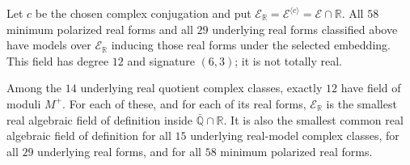 \begin{theorem}
\label{pp:thm:realdefinitionfield}
Let $c$ be the chosen complex conjugation and put
$\mathcal E_{\mathbb R}=\mathcal E^{\langle c\rangle}
=\mathcal E\cap\mathbb R$. All $58$ minimum polarized real forms
and all $29$ underlying real forms classified above have models over
$\mathcal E_{\mathbb R}$ inducing those real forms under the selected
embedding. This field has degree $12$ and signature $(6,3)$; it is
not totally real.

Among the $14$ underlying real quotient complex classes, exactly $12$
have field of moduli $M^+$. For each of these, and for each of its real
forms, $\mathcal E_{\mathbb R}$ is the smallest real algebraic field
of definition inside $\overline{\mathbb Q}\cap\mathbb R$.
It is also the smallest common real algebraic field of definition
for all $15$ underlying real-model complex classes, for all $29$
underlying real forms, and for all $58$ minimum polarized real forms.
\end{theorem}
